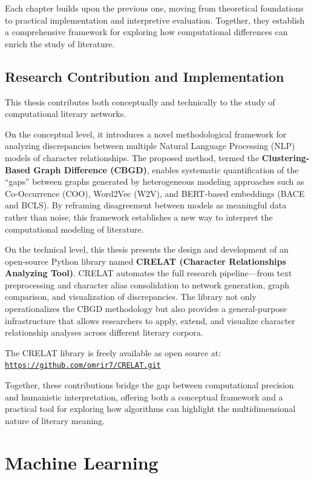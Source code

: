 \documentclass[a4paper,12pt]{report}
\begin{document}
Each chapter builds upon the previous one, moving from theoretical foundations to practical implementation and interpretive evaluation. Together, they establish a comprehensive framework for exploring how computational differences can enrich the study of literature.
\section{Research Contribution and Implementation}
This thesis contributes both conceptually and technically to the study of computational literary networks.

On the conceptual level, it introduces a novel methodological framework for analyzing discrepancies between multiple Natural Language Processing (NLP) models of character relationships. The proposed method, termed the \textbf{Clustering-Based Graph Difference (CBGD)}, enables systematic quantification of the “gaps” between graphs generated by heterogeneous modeling approaches such as Co-Occurrence (COO), Word2Vec (W2V), and BERT-based embeddings (BACE and BCLS). By reframing disagreement between models as meaningful data rather than noise, this framework establishes a new way to interpret the computational modeling of literature.

On the technical level, this thesis presents the design and development of an open-source Python library named \textbf{CRELAT (Character Relationships Analyzing Tool)}. 
CRELAT automates the full research pipeline—from text preprocessing and character alias consolidation to network generation, graph comparison, and visualization of discrepancies. 
The library not only operationalizes the CBGD methodology but also provides a general-purpose infrastructure that allows researchers to apply, extend, and visualize character relationship analyses across different literary corpora.

The CRELAT library is freely available as open source at:
\href{https://github.com/omrir7/CRELAT.git}{\texttt{https://github.com/omrir7/CRELAT.git}}

Together, these contributions bridge the gap between computational precision and humanistic interpretation, offering both a conceptual framework and a practical tool for exploring how algorithms can highlight the multidimensional nature of literary meaning.
\chapter{Machine Learning}
\label{chap:ML}
\end{document}
